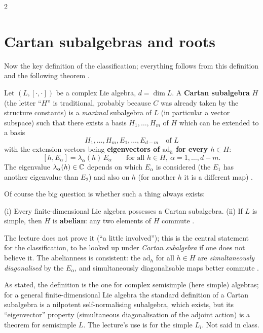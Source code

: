 \begin{paracol}{2}
\section{Cartan subalgebras and roots}\label{sec:cl-cartan}

Now the key definition of the classification; everything follows from this definition and the following theorem  .
\begin{definition}\label{def:cl-cartan}
Let $(L,[\cdot,\cdot])$ be a complex Lie algebra, $d=\dim L$. A \textbf{Cartan subalgebra} $H$ (the letter ``$H$'' is traditional, probably because $C$ was already taken by the structure constants) is a \emph{maximal} subalgebra of $L$ (in particular a vector subspace) such that there exists a basis $H_1,\dots,H_m$ of $H$ which can be extended to a basis
\[
  H_1,\dots,H_m,E_1,\dots,E_{d-m}\quad\text{of }L
\]
with the extension vectors being \textbf{eigenvectors of $\mathrm{ad}_h$ for every $h\in H$}:
\[
  [h,E_\alpha]=\lambda_\alpha(h)\,E_\alpha\qquad\text{for all }h\in H,\ \alpha=1,\dots,d-m.
\]
The eigenvalue $\lambda_\alpha(h)\in\mathbb{C}$ depends on which $E_\alpha$ is considered (the $E_1$ has another eigenvalue than $E_2$) and also on $h$ (for another $h$ it is a different map)            .
\end{definition}
Of course the big question is whether such a thing always exists:
\begin{theorem}\label{thm:cl-cartan}
(i) Every finite-dimensional Lie algebra possesses a Cartan subalgebra. (ii) If $L$ is simple, then $H$ is \textbf{abelian}: any two elements of $H$ commute     .
\end{theorem}
The lecture does not prove it (``a little involved''); this is the central statement for the classification, to be looked up under \emph{Cartan subalgebra} if one does not believe it. The abelianness is consistent: the $\mathrm{ad}_h$ for all $h\in H$ are \emph{simultaneously diagonalised} by the $E_\alpha$, and simultaneously diagonalisable maps better commute   .
\begin{coursenote}
As stated, the definition is the one for complex semisimple (here simple) algebras; for a general finite-dimensional Lie algebra the standard definition of a Cartan subalgebra is a nilpotent self-normalising subalgebra, which exists, but its ``eigenvector'' property (simultaneous diagonalisation of the adjoint action) is a theorem for semisimple $L$. The lecture's use is for the simple $L_i$. Not said in class. 
\end{coursenote}


\end{paracol}
